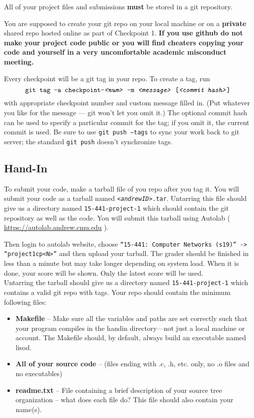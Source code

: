 All of your project files and submissions \textbf{must} be stored in a git repository.

You are supposed to create your git repo on your local machine or on a \textbf{private} shared repo hosted
online as part of
Checkpoint 1. 
{\bf If you use github do not make your project code public or you will find cheaters copying your code and yourself in a very uncomfortable academic misconduct meeting.}

Every checkpoint will be a git tag in your repo. To create a tag, run
\[
\texttt{git tag -a checkpoint-\textit{<num>} -m \textit{<message>} [\textit{<commit hash>}]}
\]
with appropriate checkpoint number and custom message filled in. (Put whatever
you like for the message --- git won't let you omit it.) The optional commit
hash can be used to specify a particular commit for the tag; if you omit it,
the current commit is used. 
Be sure to use \texttt{git push --tags} to sync
your work back to git server; the standard \texttt{git push} doesn't synchronize tags.

\subsection{Hand-In}
\label{sec:handin}

To submit your code, make a tarball file of you repo after you tag it. 
You will submit your code as a tarball named \texttt{\textit{<andrewID>}.tar}. Untarring this file should give us a directory named \texttt{15-441-project-1} which should contain the git repository as well as the code. You will submit this tarball using Autolab ( \url{https://autolab.andrew.cmu.edu} ). 

Then login to autolab website, choose \texttt{“15-441: Computer Networks (s19)” -> “project1cp\textit{<N>}”} and then upload your tarball. The grader should be finished in less than a minute but may take longer depending on system load. When it is done, your score will be shown. Only the latest score will be used.\\


Untarring the tarball should give us a directory named \texttt{15-441-project-1} which contains a valid git repo with tags. Your repo should contain the minimum following files:
\begin{itemize}
	\item \textbf{Makefile} -- Make sure all the variables and paths are set
      correctly such that your program compiles in the handin directory---not
      just a local machine or account. The Makefile should, by default, always
      build an executable named lisod.
	\item \textbf{All of your source code} -- (files ending with .c, .h,
      etc. only, no .o files and no executables)
    \item \textbf{readme.txt} -- File containing a brief description of your source tree organization -- what does each file do? This file should also contain your name(s).
	
\end{itemize}

